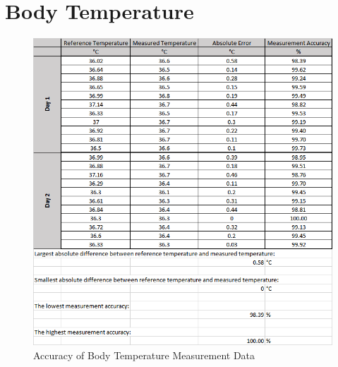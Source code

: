 \section{Body Temperature}
\begin{figure}[H]
	\centering
	\includegraphics[scale=0.7]{img/Body-Temp-Data.png}
	\caption{Accuracy of Body Temperature Measurement Data}
\end{figure}